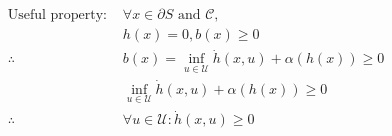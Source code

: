 \documentclass[preview]{standalone}
\begin{document}
\begin{align*}
\text{Useful property: } &\forall x \in \partial S \text{ and } \mathcal{C},\\ &h(x) = 0, b(x) \geq 0\\ \therefore &b(x) = \inf_{u \in \mathcal{U}} \dot h(x, u) + \alpha(h(x)) \geq 0\\ & \inf_{u \in \mathcal{U}} \dot h(x, u) + \alpha(h(x)) \geq 0\\ \therefore & \forall u \in \mathcal{U}: \dot h(x, u) \geq 0
\end{align*}
\end{document}
